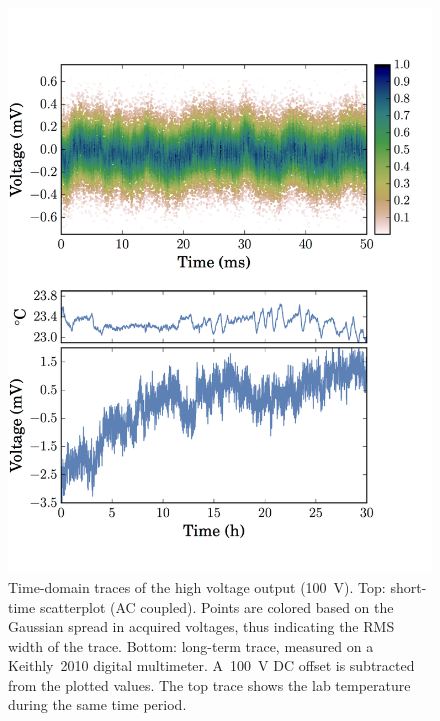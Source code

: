 \documentclass[aip,rsi,reprint]{revtex4-1} %
\begin{document}
\begin{figure}[t]
\includegraphics[width=\columnwidth]{fig/TimeDomain.pdf}
\caption{Time-domain traces of the high voltage output (\SI{100}{\volt}). Top: short-time scatterplot  (AC coupled). Points are colored based on the Gaussian spread in acquired voltages, thus indicating the RMS width of the trace. Bottom: long-term trace, measured on a Keithly~2010 digital multimeter. A~\SI{100}{\volt} DC offset is subtracted from the plotted values. The top trace shows the lab temperature during the same time period.\label{Fig:TimeDomain}}
\end{figure}
\end{document}
